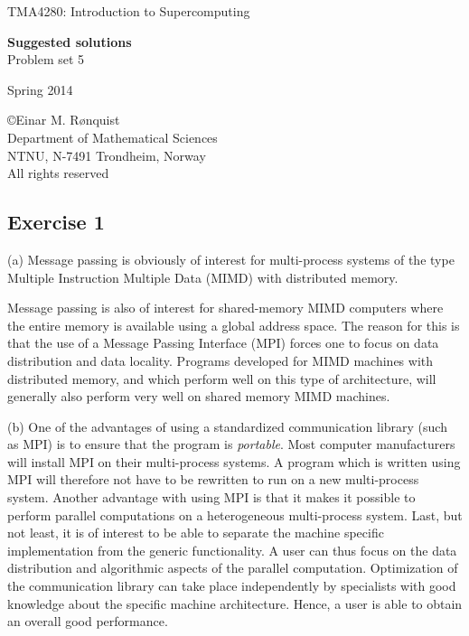 \documentclass[11pt]{article}
\begin{document}
 
\LARGE
\begin{center}
TMA4280: Introduction to Supercomputing
\end{center}
\vspace{1in}

\begin{center}
{\bf Suggested solutions} \\
Problem set 5
\end{center}

\Large
\vspace{0.5in}
\begin{center}
Spring 2014
\end{center}

\vspace{0.5in}

\begin{center}
\copyright Einar M. R{\o}nquist \\
Department of Mathematical Sciences\\
NTNU, N-7491 Trondheim, Norway\\
All rights reserved
\end{center}

\large

\newpage

\subsection*{Exercise 1}

(a) Message passing is obviously of interest for multi-process systems
of the type Multiple Instruction Multiple Data (MIMD) with distributed memory. 

Message passing is also of interest for shared-memory MIMD computers 
where the entire memory is available using a global address space.
The reason for this is that the use of a Message Passing Interface (MPI)
forces one to focus on data distribution and data locality.
Programs developed for MIMD machines with distributed memory, 
and which perform well on this type of architecture, will generally
also perform very well on shared memory MIMD machines.

(b) One of the advantages of using a standardized communication library
(such as MPI) is to ensure that the program is {\em portable}.
Most computer manufacturers will install MPI on their multi-process
systems. A program which is written using MPI will therefore not have to be 
rewritten to run on a new multi-process system. 
Another advantage with using MPI is that it makes it possible to 
perform parallel computations on a heterogeneous multi-process system. 
Last, but not least, it is of interest to be able to separate the machine specific 
implementation from the generic functionality. A user can thus 
focus on the data distribution and algorithmic aspects 
of the parallel computation. 
Optimization of the communication library can take place 
independently by specialists with good knowledge about the 
specific machine architecture. Hence, a user is able to 
obtain an overall good performance. 
\end{document}

